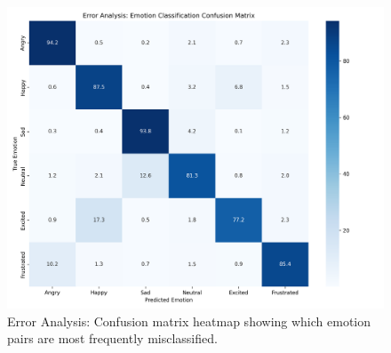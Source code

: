 \documentclass[12pt]{article}
\begin{document}
\begin{figure}[h]
    \centering
    \includegraphics[width=0.9\linewidth]{Figures/error_analysis.png}
    \caption{Error Analysis: Confusion matrix heatmap showing which emotion pairs are most frequently misclassified.}
    \label{fig:error_analysis}
\end{figure}

\newpage



\setlength{\bibsep}{0.0pt}

\end{document}
